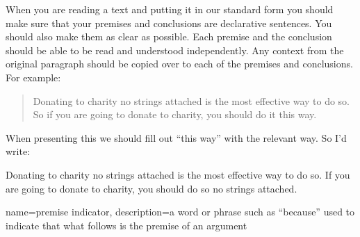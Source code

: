 When you are reading a text and putting it in our standard form you should make sure that your premises and conclusions are declarative sentences.
You should also make them as clear as possible. Each premise and the conclusion should be able to be read and understood independently. Any context from the original paragraph should be copied over to each of the premises and conclusions.
For example:
\begin{quote}
Donating to charity no strings attached is the most effective way to do so. So if you are going to donate to charity, you should do it this way.
\end{quote}
When presenting this we should fill out ``this way'' with the relevant way. So I'd write:
\begin{earg}
\prem	Donating to charity no strings attached is the most effective way to do so.
\conc  If you are going to donate to charity, you should do so no strings attached.
\end{earg}







%





{
name=premise indicator,
description={a word or phrase such as ``because'' used to indicate that what follows is the premise of an argument}
}

